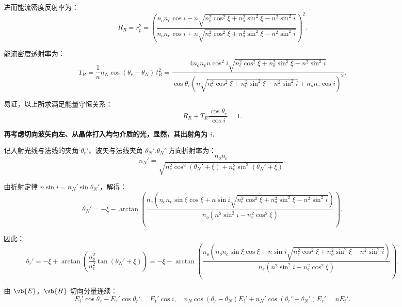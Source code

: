进而能流密度反射率为：
\begin{equation*}
	R_R = r_p^2 = \left( \dfrac{n_o n_e \cos i - n \sqrt{n_e^2 \cos^2\xi + n_o^2 \sin^2\xi - n^2 \sin^2 i}}{n_o n_e \cos i + n \sqrt{n_e^2 \cos^2\xi + n_o^2 \sin^2\xi - n^2 \sin^2 i}} \right)^2.
\end{equation*}

能流密度透射率为：
\begin{equation*}
	T_R = \dfrac{1}{n} n_N \cos(\theta_r - \theta_N) \,t_R^2 = \dfrac{4 n_o n_e n \cos^2 i \sqrt{n_e^2 \cos^2\xi + n_o^2 \sin^2\xi - n^2 \sin^2 i}}{\cos\theta_r \left( n \sqrt{n_e^2 \cos^2\xi + n_o^2 \sin^2\xi - n^2 \sin^2 i} + n_o n_e \cos i \right)^2}.
\end{equation*}

易证，以上所求满足能量守恒关系：
\begin{equation*}
	R_R + T_R \dfrac{\cos\theta_r}{\cos i} = 1.
\end{equation*}

\textbf{再考虑切向波矢向左、从晶体打入均匀介质的光，显然，其出射角为 \(i\).}

记入射光线与法线的夹角 \(\theta_r'\)、波矢与法线夹角 \(\theta_N'\).\(\theta_N'\) 方向折射率为：
\begin{equation*}
	n_N' = \dfrac{n_o n_e}{\sqrt{n_e^2 \cos^2(\theta_N' + \xi) + n_o^2 \sin^2(\theta_N' + \xi)}}.
\end{equation*}

由折射定律 \(n \sin i = n_N' \sin \theta_N'\)，解得：
\begin{equation*}
	\theta_N' = -\xi - \arctan\left( \dfrac{n_e \left( n_o n_e \sin\xi \cos\xi + n \sin i \sqrt{n_e^2 \cos^2\xi + n_o^2 \sin^2\xi - n^2 \sin^2 i} \right)}{n_o \left( n^2 \sin^2 i - n_e^2 \cos^2\xi \right)} \right).
\end{equation*}

因此：
\begin{equation*}
	\theta_r' = -\xi + \arctan\left( \dfrac{n_o^2}{n_e^2} \tan(\theta_N' + \xi) \right) = -\xi - \arctan\left( \dfrac{n_o \left( n_o n_e \sin\xi \cos\xi + n \sin i \sqrt{n_e^2 \cos^2\xi + n_o^2 \sin^2\xi - n^2 \sin^2 i} \right)}{n_e \left( n^2 \sin^2 i - n_e^2 \cos^2\xi \right)} \right).
\end{equation*}

由 \(\vb{E}\)，\(\vb{H}\) 切向分量连续：
\begin{equation*}
	E_i' \cos\theta_r - E_r' \cos\theta_r' = E_t' \cos i,\quad
	n_N \cos(\theta_r - \theta_N) E_i' + n_N' \cos(\theta_r' - \theta_N') E_r' = n E_t'.
\end{equation*}

